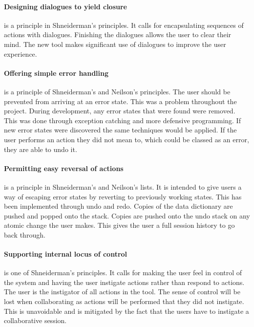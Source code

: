 \paragraph*{Designing dialogues to yield closure} is a principle in Shneiderman's principles.  It calls for encapsulating sequences of actions with dialogues.  Finishing the dialogues allows the user to clear their mind.  The new tool makes significant use of dialogues to improve the user experience.

\paragraph*{Offering simple error handling} is a principle of Shneiderman's and Neilson's principles.  The user should be prevented from arriving at an error state.  This was a problem throughout the project.  During development, any error states that were found were removed. This was done through exception catching and more defensive programming.  If new error states were discovered the same techniques would be applied.  If the user performs an action they did not mean to, which could be classed as an error, they are able to undo it.

\paragraph*{Permitting easy reversal of actions} is a principle in Shneiderman's and Neilson's lists.  It is intended to give users a way of escaping error states by reverting to previously working states.  This has been implemented through undo and redo.  Copies of the data dictionary are pushed and popped onto the stack.  Copies are pushed onto the undo stack on any atomic change the user makes.  This gives the user a full session history to go back through.

\paragraph*{Supporting internal locus of control} is one of Shneiderman's principles.  It calls for making the user feel in control of the system and having the user instigate actions rather than respond to actions.  The user is the instigator of all actions in the tool.  The sense of control will be lost when collaborating as actions will be performed that they did not instigate.  This is unavoidable and is mitigated by the fact that the users have to instigate a collaborative session.

